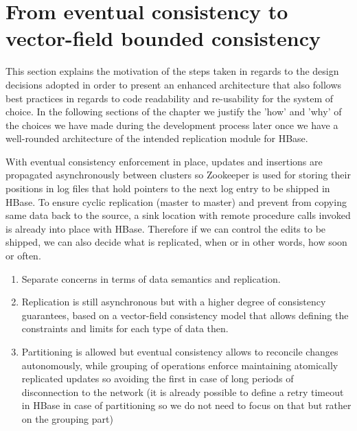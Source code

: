 


\section{From eventual consistency to vector-field bounded consistency}\label{architecture:requirements}
This section explains the motivation of the steps taken in regards to the design decisions adopted in order to present an enhanced architecture that also follows best practices in regards to code readability and re-usability for the system of choice. In the following sections of the chapter we justify the 'how' and 'why' of the choices we have made during the development process later once we have a well-rounded architecture of the intended replication module for HBase.

With eventual consistency enforcement in place, updates and insertions are propagated asynchronously between clusters so Zookeeper is used for storing their positions in log files that hold pointers to the next log entry to be shipped in HBase. To ensure cyclic replication (master to master) and prevent from copying same data back to the source, a sink location with remote procedure calls invoked is already into place with HBase. Therefore if we can control the edits to be shipped, we can also decide what is replicated, when or in other words, how soon or often.

\begin{enumerate}
\item Separate concerns in terms of data semantics and replication.
\item Replication is still asynchronous but with a higher degree of consistency guarantees, based on a vector-field consistency model that allows defining the constraints and limits for each type of data then.
\item Partitioning is allowed but eventual consistency allows to reconcile changes autonomously, while grouping of operations enforce maintaining atomically replicated updates so avoiding the first in case of long periods of disconnection to the network (it is already possible to define a retry timeout in HBase in case of partitioning so we do not need to focus on that but rather on the grouping part)
\end{enumerate}

